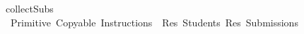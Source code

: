 \ {\isachardoublequoteopen}collectSubs\ {\isacharequal}\isanewline
\ \ Primitive\ {\isacharparenleft}Copyable\ Instructions\ {\isasymodot}\ Res\ Students{\isacharparenright}\ {\isacharparenleft}Res\ Submissions{\isacharparenright}\isanewline
{}\ {\isacharparenleft}{\isacharparenright}{\isachardoublequoteclose}
